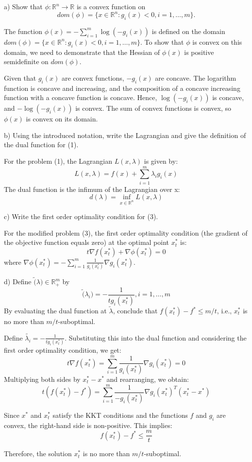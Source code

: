 \documentclass{article}
\newcommand{\RR}{\mathbb{R}}
\begin{document}
a) Show that $\phi : \RR^n \to \RR$ is a convex function on
\[dom(\phi) = \{x \in \RR^n : g_i(x) < 0, i = 1, \dots, m\}.\]

The function $\phi(x) = -\sum_{i=1}^{m} \log(-g_i(x))$ is defined on the domain
$dom(\phi) = \{x \in \RR^n : g_i(x) < 0, i = 1, \dots, m\}$. To show that $\phi$ is convex
on this domain, we need to demonstrate that the Hessian of $\phi(x)$ is positive semidefinite
on $dom(\phi)$.

Given that $g_i(x)$ are convex functions, $-g_i(x)$ are concave. The logarithm function
is concave and increasing, and the composition of a concave increasing function with
a concave function is concave. Hence, $\log(-g_i(x))$ is concave, and
$-\log(-g_i(x))$ is convex. The sum of convex functions is convex, so $\phi(x)$
is convex on its domain.

b) Using the introduced notation, write the Lagrangian and give the definition of the dual function for (1).

For the problem (1), the Lagrangian $L(x, \lambda)$ is given by:
\[L(x, \lambda) = f(x) + \sum_{i=1}^{m} \lambda_i g_i(x)\]
The dual function is the infimum of the Lagrangian over x:
\[d(\lambda) = \inf_{x \in \RR^n} L(x, \lambda)\]

c) Write the first order optimality condition for (3).

For the modified problem (3), the first order optimality condition (the gradient
of the objective function equals zero) at the optimal point $x_t^{*}$ is:
\[t \nabla f(x_t^{*}) + \nabla \phi(x_t^{*}) = 0\]
where $\nabla \phi(x_t^{*}) = - \sum_{i=1}^{m} \frac{1}{g_i(x_t^{*})} \nabla g_i(x_t^{*})$.

d) Define $\tilde(\lambda) \in \RR_{+}^m$ by
\[\tilde(\lambda_i) = -\frac{1}{t g_i(x_t^{*})}, i = 1, \dots, m\]
By evaluating the dual function at $\tilde{\lambda}$, conclude that $f(x_t^{*}) - f^{*} \leq m/t$, i.e., $x_t^{*}$ is no more than $m/t$-suboptimal.

Define $\tilde{\lambda_i} = -\frac{1}{t g_i(x_t^{*})}$. Substituting this into the
dual function and considering the first order optimality condition, we get:
\[t \nabla f(x_t^{*}) = \sum_{i=1}^{m} \frac{1}{g_i(x_t^{*})} \nabla g_i(x_t^{*}) = 0\]
Multiplying both sides by $x_t^{*} - x^{*}$ and rearranging, we obtain:
\[t(f(x_t^{*}) - f^{*}) = \sum_{i=1}^{m} \frac{1}{-g_i(x_t^{*})} \nabla g_i(x_t^{*})^T (x_t^{*} - x^{*})\]

Since $x^{*}$ and $x_t^{*}$ satisfy the KKT conditions and the functions $f$ and $g_i$
are convex, the right-hand side is non-positive. This implies:
\[f(x_t^{*}) - f^{*} \leq \frac{m}{t}\]

Therefore, the solution $x_t^{*}$ is no more than $m/t$-suboptimal.
\end{document}
